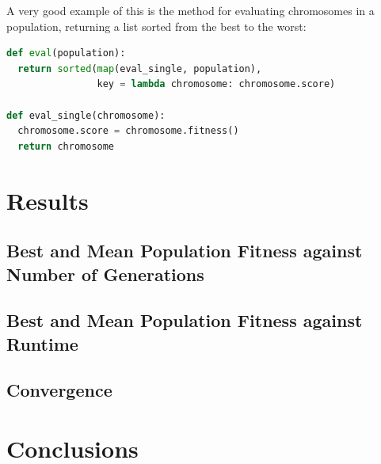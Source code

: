 \documentclass[10pt, a4paper]{article}
\begin{document}
A very good example of this is the method for evaluating chromosomes in a
population, returning a list sorted from the best to the worst:

\begin{lstlisting}[language=Python, 
                   caption=Using function elements to improve sustinctness and
                           readability]
def eval(population):
  return sorted(map(eval_single, population), 
                key = lambda chromosome: chromosome.score)

def eval_single(chromosome):
  chromosome.score = chromosome.fitness()
  return chromosome
\end{lstlisting}

\section{Results}

\subsection{Best and Mean Population Fitness against Number of Generations}

\subsection{Best and Mean Population Fitness against Runtime}

\subsection{Convergence}

\section{Conclusions}




\end{document}
